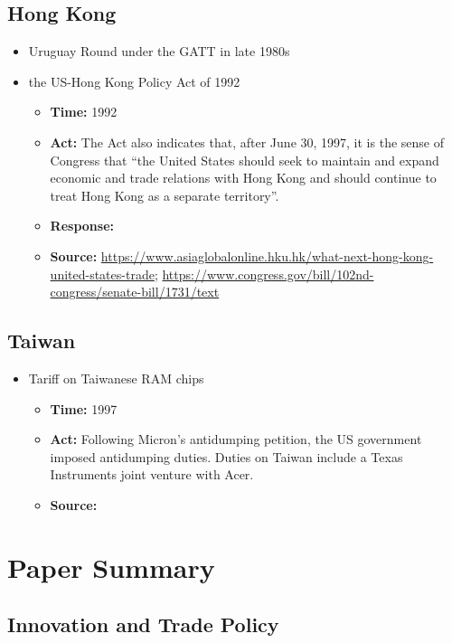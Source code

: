 	\subsection{Hong Kong}
		\begin{itemize}
		\item	Uruguay Round under the GATT in late 1980s
		\item the US-Hong Kong Policy Act of 1992
				\begin{itemize}
				\item \textbf{Time: }1992
				\item \textbf{Act: }The Act also indicates that, after June 30, 1997, it is the sense of Congress that “the United States should seek to maintain and expand economic and trade relations with Hong Kong and should continue to treat Hong Kong as a separate territory”. 
				\item \textbf{Response: }
				\item	\textbf{Source: }\url{https://www.asiaglobalonline.hku.hk/what-next-hong-kong-united-states-trade}; \url{https://www.congress.gov/bill/102nd-congress/senate-bill/1731/text}
				\end{itemize}
		\end{itemize}
		
	\subsection{Taiwan}
		\begin{itemize}
		\item	Tariff on Taiwanese RAM chips
			\begin{itemize}
			\item \textbf{Time: } 1997
			\item \textbf{Act: } Following Micron's antidumping petition, the US government imposed antidumping duties. Duties on Taiwan include a Texas Instruments joint venture with Acer.
			\item	\textbf{Source: }\cite{Bown2020}
			\end{itemize}
		\end{itemize}
		
		
\section{Paper Summary}
	\subsection{Innovation and Trade Policy}
	
